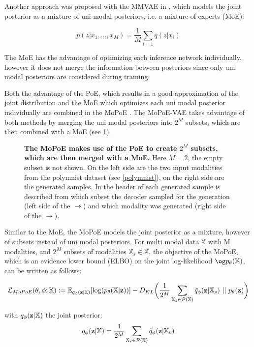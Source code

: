 Another approach was proposed with the MMVAE in \cite{shi2019variational}, which models the joint posterior as a mixture of uni modal posteriors, i.e. a mixture of experts (MoE):

\begin{equation}
    p(z|x_1,\ldots,x_M) = \frac{1}{M} \sum _{i=1} q(z|x_i)
\end{equation}

The MoE has the advantage of optimizing each inference network individually, however it does not merge the information between posteriors since only uni modal posteriors are considered during training.

Both the advantage of the PoE, which results in a good approximation of the joint distribution and the MoE which optimizes each uni modal posterior individually are combined in the MoPoE \parencite{thomas_gener-ELBO}.
The MoPoE-VAE takes advantage of both methods by merging the uni modal posteriors into $2^M$ subsets, which are then combined with a MoE (see \cref{mopoeGraph}).

\begin{figure}[h!]
    \centering
    \caption{\textbf{The MoPoE makes use of the PoE to create $2^M$ subsets, which are then merged with a MoE.} Here $M=2$, the empty subset is not shown. On the left side are the two input modalities from the polymnist dataset (see \cref{polymnist}), on the right side are the generated samples. In the header of each generated sample is described from which subset the decoder sampled for the generation (left side of the $\rightarrow$) and which modality was generated (right side of the $\rightarrow$).}
    \label{mopoeGraph}
\end{figure}

Similar to the MoE, the MoPoE models the joint posterior as a mixture, however of subsets instead of uni modal posteriors.
For multi modal data $\mathbb{X}$ with M modalities, and $2^M$ subsets of modalities $\mathbb{X}_s \in \mathbb{X}$, the objective of the MoPoE, which is an evidence lower bound (ELBO) on the joint log-likelihood $\og p_{\theta}(\xset)$, can be written as follows:

\begin{equation}
    \mathcal{L}_{MoPoE}(\theta, \phi; \mathbb{X}):= \mathbb{E}_{q_{\phi}(\textbf{z}|\mathbb{X})}[\log (p_{\theta}(\mathbb{X}|\textbf{z}))] - D_{KL}\biggl( \frac{1}{2^M} \sum _{\mathbb{X}_s \in \mathcal{P}(\mathbb{X})} \tilde{q}_{\phi}(\textbf{z}|\mathbb{X}_s)\ ||\ p_{\theta}(\textbf{z})\biggr)
\end{equation}

with $q_{\phi}(\textbf{z}|\mathbb{X})$ the joint posterior:
\begin{equation}
    q_{\phi}(\textbf{z}|\mathbb{X}) = \frac{1}{2^M} \sum _{\mathbb{X}_s \in \mathcal{P}(\mathbb{X})} \tilde{q}_{\phi}(\textbf{z}|\mathbb{X}_s)
\end{equation}

